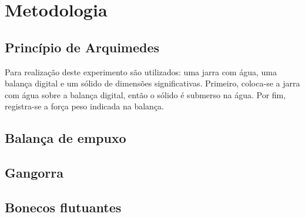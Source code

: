 \section{Metodologia}

\subsection{Princípio de Arquimedes}
Para realização deste experimento são utilizados: uma jarra com água, uma balança digital e um sólido de dimensões significativas. Primeiro, coloca-se a jarra com água sobre a balança digital, então o sólido é submerso na água. Por fim, registra-se a força peso indicada na balança.

\subsection{Balança de empuxo}


\subsection{Gangorra}


\subsection{Bonecos flutuantes}



